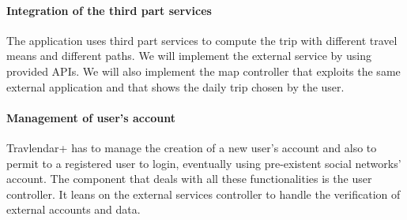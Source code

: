 \documentclass[12pt,titlepage]{article}
\begin{document}
\paragraph{Integration of the third part services}
The application uses third part services to compute the trip with different travel means and different paths. We will implement the external service by using provided APIs. We will also implement the map controller that exploits the same external application and that shows the daily trip chosen by the user.
\begin{figure}[H]
\centering
{}
\end{figure}
\paragraph{Management of user's account}
Travlendar+ has to manage the creation of a new user's account and also to permit to a registered user to login, eventually using pre-existent social networks' account. The component that deals with all these functionalities is the user controller. It leans on the external services controller to handle the verification of external accounts and data.
 \begin{figure}[H]
\centering
{}
\end{figure}
\end{document}
